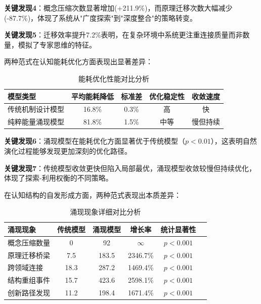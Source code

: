 \documentclass[12pt,a4paper]{article}
\begin{document}
\textbf{关键发现4}：概念压缩次数显著增加(+211.9\%)，而原理迁移次数大幅减少(-87.7\%)，体现了系统从"广度探索"到"深度整合"的策略转变。

\textbf{关键发现5}：迁移效率提升7.2\%表明，在复杂环境中系统更注重连接质量而非数量，模拟了专家思维的特征。



两种范式在认知能耗优化方面表现出显著差异：

\begin{table}[h]
\centering
\caption{能耗优化性能对比分析}
\label{tab:energy_comparison_detailed}
\begin{tabular}{lcccc}
\toprule
\textbf{模型类型} & \textbf{平均能耗降低} & \textbf{标准差} & \textbf{优化稳定性} & \textbf{收敛速度} \\
\midrule
传统机制设计模型 & 16.8\% & 0.3\% & 高 & 快 \\
纯粹能量涌现模型 & 81.8\% & 1.5\% & 中等 & 慢但持续 \\
\bottomrule
\end{tabular}
\end{table}

\textbf{关键发现6}：涌现模型在能耗优化方面显著优于传统模型（$p < 0.01$），这表明自然演化过程能够发现更加深刻的优化路径。

\textbf{关键发现7}：传统模型收敛更快但陷入局部最优，涌现模型收敛较慢但持续优化，体现了探索-利用权衡的不同策略。




在认知结构的自发形成方面，两种范式表现出本质差异：

\begin{table}[h]
\centering
\caption{涌现现象详细对比分析}
\label{tab:emergence_detailed}
\begin{tabular}{lccccc}
\toprule
\textbf{涌现现象} & \textbf{传统模型} & \textbf{涌现模型} & \textbf{增长率} & \textbf{统计显著性} \\
\midrule
概念压缩数量 & 0 & 92 & $\infty$ & $p < 0.001$ \\
原理迁移桥梁 & 7.5 & 183.5 & 2346.7\% & $p < 0.001$ \\
跨领域连接 & 18.3 & 287.2 & 1469.4\% & $p < 0.001$ \\
结构重组事件 & 15.7 & 423.6 & 2598.1\% & $p < 0.001$ \\
创新路径发现 & 11.2 & 198.4 & 1671.4\% & $p < 0.001$ \\
\bottomrule
\end{tabular}
\end{table}
\end{document}
